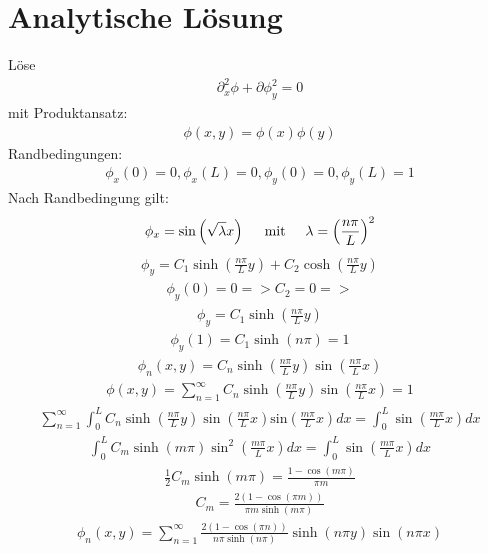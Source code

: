 \documentclass[paper=a4, ngerman]{scrartcl}
\begin{document}
\section{Analytische Lösung}
Löse 
\begin{align}
\partial _x^2 \phi +\partial \phi_y^2 = 0 
\end{align}
mit Produktansatz:
\begin{align}
\phi (x,y) = \phi(x)\phi(y)
\end{align}
Randbedingungen:
\begin{align}
\phi_x(0) = 0, \phi_x(L) = 0, \phi_y(0) = 0, \phi_y(L) = 1
\end{align}
Nach Randbedingung gilt:
\begin{align}
\phi_x = \sin\left(\sqrt{\lambda} x \right) \hspace{.5cm}\text{mit}\hspace{.5cm} \lambda = \left( \frac{n \pi}{L} \right)^2
\end{align}
\begin{align}
\phi_y = C_1 \sinh\left( \frac{n \pi}{L}y \right) + C_2 \cosh \left( \frac{n \pi}{L}y \right) 
\end{align}
\begin{align}
\phi_y(0) = 0 => C_2 = 0 => 
\end{align}
\begin{align}
\phi_y = C_1 \sinh\left( \frac{n \pi}{L}y \right) 
\end{align}
\begin{align}
\phi_y(1) = C_1 \sinh\left( n \pi \right) = 1
\end{align}
\begin{align}
\phi_n (x,y) = C_n \sinh\left(\frac{n \pi}{L} y \right) \sin\left( \frac{n \pi}{L} x \right) 
\end{align}
\begin{align}
\phi(x,y) = \sum _{n = 1}^{\infty} C_n \sinh\left(\frac{n \pi}{L} y \right) \sin\left( \frac{n \pi}{L} x \right) = 1
\end{align}
\begin{align}
 \sum _{n = 1}^{\infty} \int _0^L C_n \sinh\left(\frac{n \pi}{L} y \right) \sin\left( \frac{n \pi}{L} x \right) \text{sin} \left( \frac{m \pi}{L} x \right) dx = \int _0^L \sin \left( \frac{m \pi}{L} x \right) dx
\end{align}
\begin{align}
\int _0^L C_m \sinh (m \pi) \sin^2 \left( \frac{m \pi}{L} x \right) dx = 
\int_0^L \sin \left( \frac{m \pi}{L} x \right) dx
\end{align}
\begin{align}
\frac{1}{2} C_m \sinh (m \pi) = \frac{1 - \cos(m \pi)}{\pi m} 
\end{align}
\begin{align}
C_m = \frac{2(1-\cos(\pi m))}{\pi m \sinh(m \pi)} 
\end{align}
\begin{align}
\phi_n (x,y) = \sum_{n=1} ^\infty \frac{2(1- \cos(\pi n))}{n \pi \sinh(n \pi)} \sinh(n \pi y) \sin (n \pi x)
\end{align}
\end{document}
